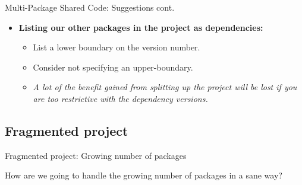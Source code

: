 \documentclass[10pt]{beamer}
\begin{document}
\begin{frame}[fragile]{Multi-Package Shared Code: Suggestions cont.}
  \begin{itemize}
    \item \textbf{Listing our other packages in the project as dependencies:}
      \begin{itemize}
        \item List a lower boundary on the version number.
        \item Consider not specifying an upper-boundary.
        \item \textit{A lot of the benefit gained from splitting up the project will be lost if you are too restrictive with the dependency versions.}
      \end{itemize}
  \end{itemize}
\end{frame}




\subsection{Fragmented project}

\begin{frame}[fragile]{Fragmented project: Growing number of packages}

  How are we going to handle the growing number of packages in a sane way?

\end{frame}



\end{document}

